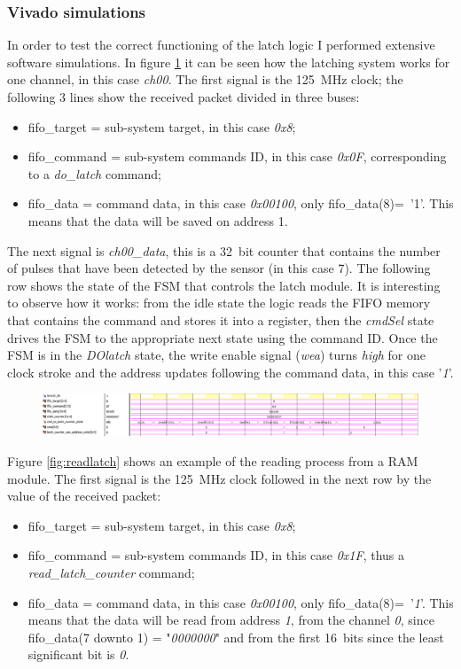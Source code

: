 \subsubsection{Vivado simulations}
\noindent In order to test the correct functioning of the latch logic I performed extensive software simulations. In figure \ref{fig:dolatch} it can be seen how the latching system works for one channel, in this case \textit{ch00}. The first signal is the 125~MHz clock; the following 3 lines show the received packet divided in three buses:
\begin{itemize}
	\item fifo\_target = sub-system target, in this case \textit{0x8};
	\item fifo\_command = sub-system commands ID, in this case \textit{0x0F}, corresponding to a \textit{do\_latch} command;
	\item fifo\_data = command data, in this case \textit{0x00100}, only fifo\_data(8)=~'1'. This means that the data will be saved on address 1.
\end{itemize} 
The next signal is \textit{ch00\_data}, this is a 32~bit counter that contains the number of pulses that have been detected by the sensor (in this case 7).
The following row shows the state of the FSM that controls the latch module. It is interesting to observe how it works:
from the idle state the logic reads the FIFO memory that contains the command and stores it into a register, then the \textit{cmdSel} state drives the FSM to the appropriate next state using the command ID.
Once the FSM is in the \textit{DOlatch} state, the write enable signal (\textit{wea}) turns \textit{high} for one clock stroke and the address updates following the command data, in this case '\textit{1}'.  
\begin{figure}[H]
	\centering
	\includegraphics[width=1.0\linewidth]{IMG/ch4/LATCHsimulations/DOLATCH}
	\caption{}
	\label{fig:dolatch}
\end{figure}
\noindent Figure \ref{fig:readlatch} shows an example of the reading process from a RAM module. The first signal is the 125~MHz clock followed in the next row by the value of the received packet:
\begin{itemize}
	\item fifo\_target = sub-system target, in this case \textit{0x8};
	\item fifo\_command = sub-system commands ID, in this case \textit{0x1F}, thus a \textit{read\_latch\_counter} command;
	\item fifo\_data = command data, in this case \textit{0x00100}, only fifo\_data(8)=~'\textit{1}'. This means that the data will be read from address \textit{1}, from the channel \textit{0}, since fifo\_data(7 downto 1) = "\textit{0000000}" and from the first 16~bits since the least significant bit is \textit{0}.
\end{itemize}
